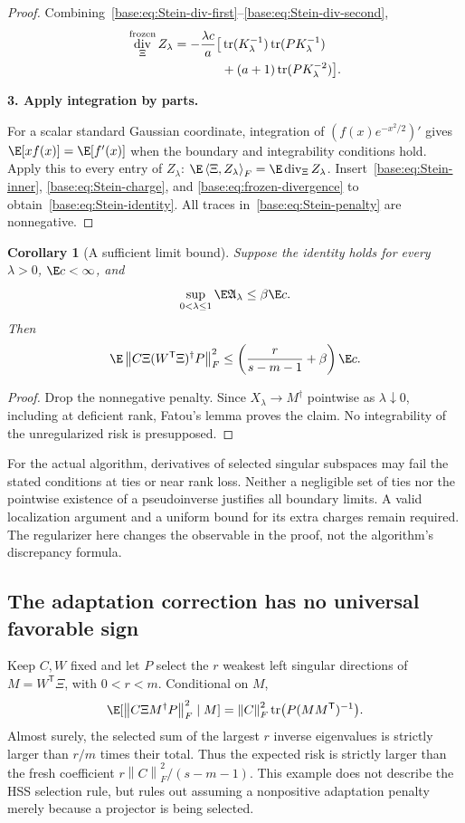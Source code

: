 \documentclass[11pt,oneside,openany,a4paper]{book}
\numberwithin{equation}{chapter}
\newtheorem{corollary}[theorem]{Corollary}
\theoremstyle{definition}
\theoremstyle{remark}
\newcommand{\proofstep}[1]{\par\addvspace{.45\baselineskip}\Needspace{3\baselineskip}\textbf{#1}\par\nobreak}
\newcommand{\T}{\mathsf T}\newcommand{\Id}{I}
\newcommand{\F}[1]{\left\lVert#1\right\rVert_F}
\newcommand{\ip}[2]{\left\langle#1,#2\right\rangle_F}
\DeclareMathOperator{\tr}{tr}\DeclareMathOperator{\rank}{rank}
\DeclareMathOperator{\diver}{div}\DeclareMathOperator{\vecop}{vec}\DeclareMathOperator{\Gammafun}{Gamma}
\begin{document}
\begin{proof}
Combining~\eqref{base:eq:Stein-div-first}--\eqref{base:eq:Stein-div-second},
\begin{align}
 \diver_\Xi^{\mathrm{frozen}}Z_\lambda
 =-\frac{\lambda c}{a}\bigl[
 &\tr(K_\lambda^{-1})\tr(PK_\lambda^{-1})\notag\\
 &+(a+1)\tr(PK_\lambda^{-2})\bigr].\label{base:eq:frozen-divergence}
\end{align}
\proofstep{3. Apply integration by parts.}
For a scalar standard Gaussian coordinate, integration of
$(f(x)e^{-x^2/2})'$ gives $\E[xf(x)]=\E[f'(x)]$ when the boundary and
integrability conditions hold. Apply this to every entry of $Z_\lambda$:
$\E\ip\Xi{Z_\lambda}=\E\diver_\Xi Z_\lambda$.
Insert~\eqref{base:eq:Stein-inner}, \eqref{base:eq:Stein-charge}, and
\eqref{base:eq:frozen-divergence} to obtain~\eqref{base:eq:Stein-identity}.
All traces in~\eqref{base:eq:Stein-penalty} are nonnegative.\end{proof}

\begin{corollary}[A sufficient limit bound]\label{base:cor:Stein-limit}
Suppose the identity holds for every $\lambda>0$, $\E c<\infty$, and
\[
 \sup_{0<\lambda\le1}\E\mathfrak A_\lambda\le\beta\E c.
\]
Then
\begin{equation}\label{base:eq:Stein-limit}
 \E\F{C\Xi(W^{\T}\Xi)^\dagger P}^2
 \le\left(\frac r{s-m-1}+\beta\right)\E c.
\end{equation}
\end{corollary}
\begin{proof}
Drop the nonnegative penalty. Since $X_\lambda\to M^\dagger$ pointwise
as $\lambda\downarrow0$, including at deficient rank, Fatou's lemma proves
the claim. No integrability of the unregularized risk is presupposed.
\end{proof}

For the actual algorithm, derivatives of selected singular subspaces may
fail the stated conditions at ties or near rank loss. Neither a negligible
set of ties nor the pointwise existence of a pseudoinverse justifies all
boundary limits. A valid localization argument and a uniform bound for its
extra charges remain required. The regularizer here changes the observable
in the proof, not the algorithm's discrepancy formula.

\subsection{The adaptation correction has no universal favorable sign}
Keep $C,W$ fixed and let $P$ select the $r$ weakest left singular directions
of $M=W^{\T}\Xi$, with $0<r<m$. Conditional on $M$,
\[
 \E[\F{C\Xi M^\dagger P}^2\mid M]
 =\F C^2\tr\bigl(P(MM^{\T})^{-1}\bigr).
\]
Almost surely, the selected sum of the largest $r$ inverse eigenvalues is
strictly larger than $r/m$ times their total. Thus the expected risk is
strictly larger than the fresh coefficient $r\F C^2/(s-m-1)$.
This example does not describe the HSS selection rule, but rules out
assuming a nonpositive adaptation penalty merely because a projector is
being selected.
\end{document}
